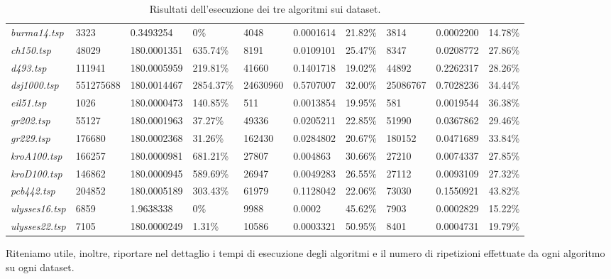 \begin{landscape}
\begin{table}[]
\begin{tabular}{|l|l|l|l|l|l|l|l|l|l|}
  \textit{burma14.tsp} & 3323 & 0.3493254 & 0\% & 4048 & 0.0001614 & 21.82\% & 3814 & 0.0002200 & 14.78\% \\ 
  \textit{ch150.tsp} & 48029 & 180.0001351 & 635.74\% & 8191 & 0.0109101 & 25.47\% & 8347 & 0.0208772 & 27.86\% \\ 
  \textit{d493.tsp} & 111941 & 180.0005959 & 219.81\% & 41660 & 0.1401718 & 19.02\% & 44892 & 0.2262317 & 28.26\% \\ 
  \textit{dsj1000.tsp} & 551275688 & 180.0014467 & 2854.37\% & 24630960 & 0.5707007 & 32.00\% & 25086767 & 0.7028236 & 34.44\% \\ 
  \textit{eil51.tsp} & 1026 & 180.0000473 & 140.85\% & 511 & 0.0013854 & 19.95\% & 581 & 0.0019544 & 36.38\% \\ 
  \textit{gr202.tsp} & 55127 & 180.0001963 & 37.27\% & 49336 & 0.0205211 & 22.85\% & 51990 & 0.0367862 & 29.46\% \\ 
  \textit{gr229.tsp} & 176680 & 180.0002368 & 31.26\% & 162430 & 0.0284802 & 20.67\% & 180152 & 0.0471689 & 33.84\% \\ 
  \textit{kroA100.tsp} & 166257 & 180.0000981 & 681.21\% & 27807 & 0.004863 & 30.66\% & 27210 & 0.0074337 & 27.85\% \\ 
  \textit{kroD100.tsp} & 146862 & 180.0000945 & 589.69\% & 26947 & 0.0049283 & 26.55\% & 27112 & 0.0093109 & 27.32\% \\ 
  \textit{pcb442.tsp} & 204852 & 180.0005189 & 303.43\% & 61979 & 0.1128042 & 22.06\% & 73030 & 0.1550921 & 43.82\% \\ 
  \textit{ulysses16.tsp} & 6859 & 1.9638338 & 0\% & 9988 & 0.0002 & 45.62\% & 7903 & 0.0002829 & 15.22\% \\ 
  \textit{ulysses22.tsp} & 7105 & 180.0000249 & 1.31\% & 10586 & 0.0003321 & 50.95\% & 8401 & 0.0004731 & 19.79\% \\ \hline
  \end{tabular}
  \caption{Risultati dell'esecuzione dei tre algoritmi sui dataset.}
  \label{tab:results}
  \end{table}
\end{landscape}


Riteniamo utile, inoltre, riportare nel dettaglio i tempi di esecuzione degli algoritmi e il numero di ripetizioni effettuate da ogni algoritmo su ogni dataset.

